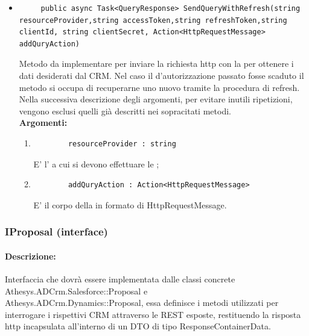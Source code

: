 \begin{itemize}
	\item 
	\begin{lstlisting}
	 public async Task<QueryResponse> SendQueryWithRefresh(string resourceProvider,string accessToken,string refreshToken,string clientId, string clientSecret, Action<HttpRequestMessage> addQuryAction)
	\end{lstlisting}
	Metodo da implementare per inviare la richiesta \gls{http} con la  per ottenere i dati desiderati dal CRM. Nel caso il  d'autorizzazione passato fosse scaduto il metodo si occupa di recuperarne uno nuovo tramite la procedura di refresh. Nella successiva descrizione degli argomenti, per evitare inutili ripetizioni, vengono esclusi quelli già descritti nei sopracitati metodi.\\
	\textbf{\small Argomenti:}
	\begin{enumerate}[leftmargin=*]
		\itemsep0em
		\item 
		\begin{lstlisting}
		resourceProvider : string
		\end{lstlisting}
		E' l' a cui si devono effettuare le ;
		\item 
		\begin{lstlisting}
		addQuryAction : Action<HttpRequestMessage>
		\end{lstlisting}
		E' il corpo della  in formato di HttpRequestMessage. 
	\end{enumerate}
\end{itemize}

\subsubsection{IProposal (interface)}

\paragraph{Descrizione:}
Interfaccia che dovrà essere implementata dalle classi concrete Athesys.ADCrm.Salesforce::Proposal e\\ Athesys.ADCrm.Dynamics::Proposal, essa definisce i metodi utilizzati per interrogare i rispettivi CRM attraverso le  REST esposte, restituendo la risposta \gls{http} incapsulata all'interno di un \gls{DTO} di tipo ResponseContainerData.

